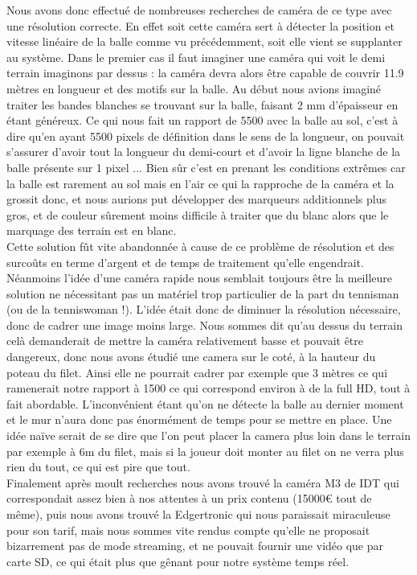 Nous avons donc effectué de nombreuses recherches de caméra de ce type avec une résolution correcte. En effet soit cette caméra sert à détecter la position et vitesse linéaire de la balle comme vu précédemment, soit elle vient se supplanter au système. Dans le premier cas il faut imaginer une caméra qui voit le demi terrain imaginons par dessus : la caméra devra alors être capable de couvrir 11.9 mètres en longueur et des motifs sur la balle. Au début nous avions imaginé traiter les bandes blanches se trouvant sur la balle, faisant 2 mm d'épaisseur en étant généreux. Ce qui nous fait un rapport de 5500 avec la balle au sol, c'est à dire qu'en ayant 5500 pixels de définition dans le sens de la longueur, on pouvait s'assurer d'avoir tout la longueur du demi-court et d'avoir la ligne blanche de la balle présente sur 1 pixel ... Bien sûr c'est en prenant les conditions extrêmes car la balle est rarement au sol mais en l'air ce qui la rapproche de la caméra et la grossit donc, et nous aurions put développer des marqueurs additionnels plus gros, et de couleur sûrement moins difficile à traiter que du blanc alors que le marquage des terrain est en blanc.\\

Cette solution fût vite abandonnée à cause de ce problème de résolution et des surcoûts en terme d'argent et de temps de traitement qu'elle engendrait. Néanmoins l'idée d'une caméra rapide nous semblait toujours être la meilleure solution ne nécessitant pas un matériel trop particulier de la part du tennisman (ou de la tenniswoman !). L'idée était donc de diminuer la résolution nécessaire, donc de cadrer une image moins large. Nous sommes dit qu'au dessus du terrain celà demanderait de mettre la caméra relativement basse et pouvait être dangereux, donc nous avons étudié une camera sur le coté, à la hauteur du poteau du filet. Ainsi elle ne pourrait cadrer par exemple que 3 mètres ce qui ramenerait notre rapport à 1500 ce qui correspond environ à de la full HD, tout à fait abordable. L'inconvénient étant qu'on ne détecte la balle au dernier moment et le mur n'aura donc pas énormément de temps pour se mettre en place. Une idée naïve serait de se dire que l'on peut placer la camera plus loin dans le terrain par exemple à 6m du filet, mais si la joueur doit monter au filet on ne verra plus rien du tout, ce qui est pire que tout.\\

Finalement après moult recherches nous avons trouvé la caméra M3 de IDT qui correspondait assez bien à nos attentes à un prix contenu (15000€ tout de même), puis nous avons trouvé la Edgertronic qui nous paraissait miraculeuse pour son tarif, mais nous sommes vite rendus compte qu'elle ne proposait bizarrement pas de mode streaming, et ne pouvait fournir une vidéo que par carte SD, ce qui était plus que gênant pour notre système temps réel.\\

